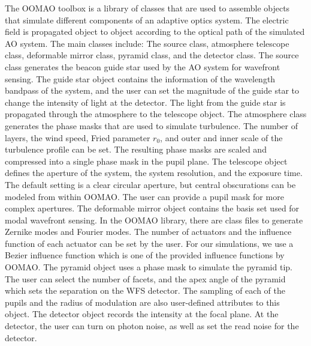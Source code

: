 The OOMAO toolbox is a library of classes that are used to assemble objects that simulate different components of an adaptive optics system. The electric field is propagated object to object according to the optical path of the simulated AO system. The main classes include: The source class, atmosphere telescope class, deformable mirror class, pyramid class, and the detector class. The source class generates the beacon guide star used by the AO system for wavefront sensing. The guide star object contains the information of the wavelength bandpass of the system, and the user can set the magnitude of the guide star to change the intensity of light at the detector. The light from the guide star is propagated through the atmosphere to the telescope object. The atmosphere class generates the phase masks that are used to simulate turbulence. The number of layers, the wind speed, Fried parameter $r_0$, and outer and inner scale of the turbulence profile can be set. The resulting phase masks are scaled and compressed into a single phase mask in the pupil plane.  The telescope object defines the aperture of the system, the system resolution, and the exposure time. The default setting is a clear circular aperture, but central obscurations can be modeled from within OOMAO. The user can provide a pupil mask for more complex apertures. The deformable mirror object contains the basis set used for modal wavefront sensing. In the OOMAO library, there are class files to generate Zernike modes and Fourier modes. The number of actuators and the influence function of each actuator can be set by the user. For our simulations, we use a Bezier influence function which is one of the provided influence functions by OOMAO. The pyramid object uses a phase mask to simulate the pyramid tip. The user can select the number of facets, and the apex angle of the pyramid which sets the separation on the WFS detector. The sampling of each of the pupils and the radius of modulation are also user-defined attributes to this object. The detector object records the intensity at the focal plane. At the detector, the user can turn on photon noise, as well as set the read noise for the detector. 




